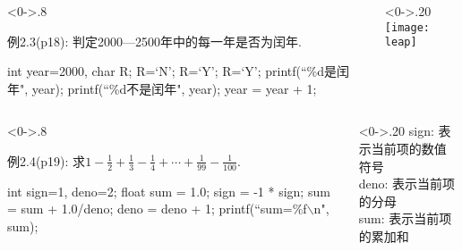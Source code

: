 \begin{frame}[shrink]
\begin{columns}%
	\begin{column}<0->{.8\textwidth}
		\begin{algorithm}[H]  
			\caption{例2.3(p18): 判定2000—2500年中的每一年是否为闰年.} %
			\begin{algorithmic}[1] %
				\State int year=2000, char R; 
				\State R=`N';  
				 R=`Y'; %
				 R=`Y';
				\EndIf
				 printf(``\%d是闰年", year); 
				\Else \quad printf(``\%d不是闰年", year);
				\EndIf	
				\State year = year + 1;
				\EndWhile
			\end{algorithmic}  
		\end{algorithm}
	\end{column}%
	\begin{column}<0->{.20\textwidth}
		\newline
		\newline 
		\newline
		\newline 
		\newline
		\newline 
		\texttt{[image: leap]}
	\end{column}%
\end{columns}
\end{frame}

\begin{frame}%
\begin{columns}%
	\begin{column}<0->{.8\textwidth}
		\begin{algorithm}[H]  
			\caption{例2.4(p19): 求$1-\frac{1}{2}+\frac{1}{3}-\frac{1}{4}+\cdots+\frac{1}{99}-\frac{1}{100}$.} %
			\begin{algorithmic}[1] %
				\State int sign=1, deno=2;
				\State float sum = 1.0; 
				\State sign = -1 * sign;
				\State sum = sum + 1.0/deno; 
				\State deno = deno + 1; 
				\EndWhile
				\State printf(``sum=\%f$\backslash$n", sum);	
			\end{algorithmic}  
		\end{algorithm}
	\end{column}%
	\begin{column}<0->{.20\textwidth}
		\newline
		\newline
		sign: 表示当前项的数值符号\\
		deno: 表示当前项的分母\\
		sum:  表示当前项的累加和
	\end{column}%
\end{columns}
\end{frame}

